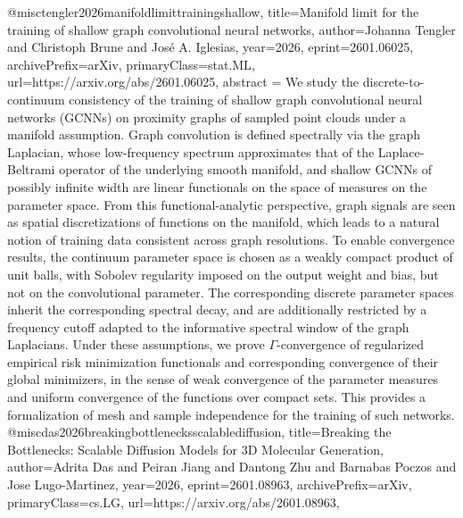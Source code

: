 {}@misc{tengler2026manifoldlimittrainingshallow,
      title={Manifold limit for the training of shallow graph convolutional neural networks}, 
      author={Johanna Tengler and Christoph Brune and José A. Iglesias},
      year={2026},
      eprint={2601.06025},
      archivePrefix={arXiv},
      primaryClass={stat.ML},
      url={https://arxiv.org/abs/2601.06025},
      abstract = {We study the discrete-to-continuum consistency of the training of shallow graph convolutional neural networks (GCNNs) on proximity graphs of sampled point clouds under a manifold assumption. Graph convolution is defined spectrally via the graph Laplacian, whose low-frequency spectrum approximates that of the Laplace-Beltrami operator of the underlying smooth manifold, and shallow GCNNs of possibly infinite width are linear functionals on the space of measures on the parameter space. From this functional-analytic perspective, graph signals are seen as spatial discretizations of functions on the manifold, which leads to a natural notion of training data consistent across graph resolutions. To enable convergence results, the continuum parameter space is chosen as a weakly compact product of unit balls, with Sobolev regularity imposed on the output weight and bias, but not on the convolutional parameter. The corresponding discrete parameter spaces inherit the corresponding spectral decay, and are additionally restricted by a frequency cutoff adapted to the informative spectral window of the graph Laplacians. Under these assumptions, we prove $Γ$-convergence of regularized empirical risk minimization functionals and corresponding convergence of their global minimizers, in the sense of weak convergence of the parameter measures and uniform convergence of the functions over compact sets. This provides a formalization of mesh and sample independence for the training of such networks.}
}@misc{das2026breakingbottlenecksscalablediffusion,
      title={Breaking the Bottlenecks: Scalable Diffusion Models for 3D Molecular Generation}, 
      author={Adrita Das and Peiran Jiang and Dantong Zhu and Barnabas Poczos and Jose Lugo-Martinez},
      year={2026},
      eprint={2601.08963},
      archivePrefix={arXiv},
      primaryClass={cs.LG},
      url={https://arxiv.org/abs/2601.08963},
}
